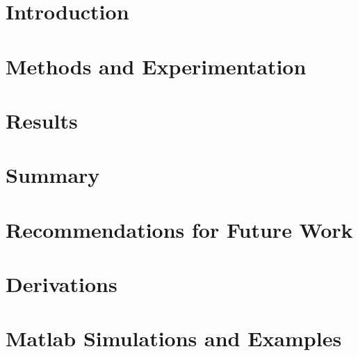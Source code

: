 \documentclass[12pt,american]{report}
\begin{document}
\renewcommand\thepage{}

\newpage
\mbox{}
\newpage

\renewcommand\thepage{\arabic{page}}
\setcounter{page}{2}

\doublespacing%



\singlespacing%
\tableofcontents             %
\listoffigures               %



\cleardoublepage%


\doublespacing%

\chapter{Introduction}

\chapter{Methods and Experimentation}



\chapter{Results}

\chapter{Summary}

\chapter{Recommendations for Future Work}


\appendix
\chapter{Derivations}

\chapter{Matlab Simulations and Examples}




\end{document}
